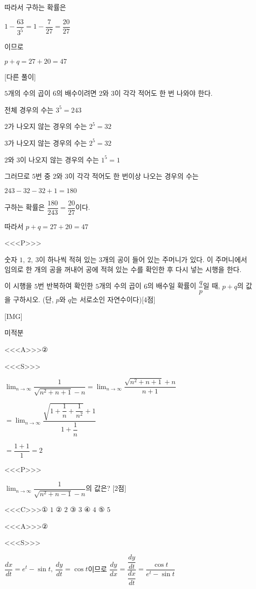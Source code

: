 \documentclass{oblivoir}
\begin{document}
따라서 구하는 확률은

$1-\dfrac{63}{3^{5}}=1-\dfrac{7}{27}=\dfrac{20}{27}$

이므로

$p+q=27+20=47$

[다른 풀이]

$5$개의 수의 곱이 $6$의 배수이려면 $2$와 $3$이 각각 적어도 한 번 나와야 한다.

전체 경우의 수는 $3^{5}=243$

$2$가 나오지 않는 경우의 수는 $2^{5}=32$

$3$가 나오지 않는 경우의 수는 $2^{5}=32$

$2$와 $3$이 나오지 않는 경우의 수는 $1^{5}=1$

그러므로 $5$번 중 $2$와 $3$이 각각 적어도 한 번이상 나오는 경우의 수는 

$243-32-32+1=180$

구하는 확률은 $\dfrac{180}{243}=\dfrac{20}{27}$이다.

따라서 $p+q=27+20=47$

<<<P>>>

숫자 $1,\: 2,\: 3$이 하나씩 적혀 있는 $3$개의 공이 들어 있는 주머니가 있다. 이 주머니에서 임의로 한 개의 공을 꺼내어 공에 적혀 있는 수를 확인한 후 다시 넣는 시행을 한다.

이 시행을 $5$번 반복하여 확인한 $5$개의 수의 곱이 $6$의 배수일 확률이 $\dfrac{q}{p}$일 때, $p+q$의 값을 구하시오. (단, $p$와 $q$는 서로소인 자연수이다)[4점]

[IMG]

미적분

<<<A>>>②

<<<S>>>

$\displaystyle\lim_{n\to \infty}\dfrac{1}{\sqrt{n^{2}+n+1}-n}$$=\displaystyle\lim_{n\to \infty}\dfrac{\sqrt{n^{2}+n+1}+n}{n+1}$

$=\displaystyle\lim_{n\to \infty}\dfrac{\sqrt{1 +\dfrac{1}{n}+\dfrac{1}{n^{2}}}+1}{1+\dfrac{1}{n}}$

$=\dfrac{1+1}{1}=2$

<<<P>>>

$\displaystyle\lim_{n\to \infty}$$\dfrac{1}{\sqrt{n^{2}+n-1}-n}$의 값은? [2점]

<<<C>>>① $1$ ② $2$ ③ $3$ ④ $4$ ⑤ $5$

<<<A>>>②

<<<S>>>

$\dfrac{dx}{dt}= e^{t}-\sin t ,\:\dfrac{dy}{dt}=\cos t$이므로 $\dfrac{dy}{dx}=\dfrac{\dfrac{dy}{dt}}{\dfrac{dx}{dt}}=\dfrac{\cos t}{e^{t}-\sin t}$
\end{document}
